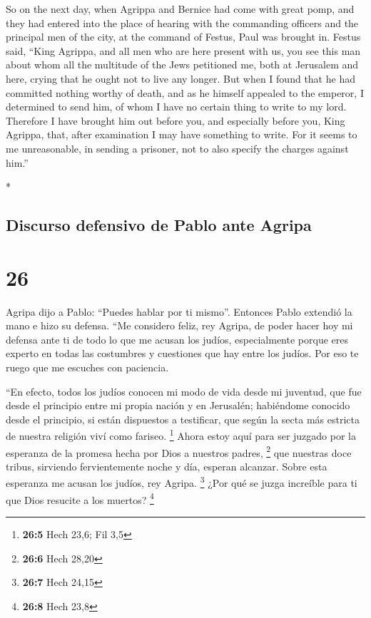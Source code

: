 \begin{paracol}{2}
\begin{otherlanguage}{english}
 So on the next day, when Agrippa and Bernice had come
with great pomp, and they had entered into the place of hearing with the
commanding officers and the principal men of the city, at the command of
Festus, Paul was brought in.  Festus said, ``King
Agrippa, and all men who are here present with us, you see this man
about whom all the multitude of the Jews petitioned me, both at
Jerusalem and here, crying that he ought not to live any longer.
 But when I found that he had committed nothing worthy of
death, and as he himself appealed to the emperor, I determined to send
him,  of whom I have no certain thing to write to my
lord. Therefore I have brought him out before you, and especially before
you, King Agrippa, that, after examination I may have something to
write.  For it seems to me unreasonable, in sending a
prisoner, not to also specify the charges against him.''

\end{otherlanguage}

\switchcolumn[0]*

\hypertarget{discurso-defensivo-de-pablo-ante-agripa}{%
\subsection{Discurso defensivo de Pablo ante
Agripa}\label{discurso-defensivo-de-pablo-ante-agripa}}

\hypertarget{section-50}{%
\section{26}\label{section-50}}

 Agripa dijo a Pablo: ``Puedes hablar por ti mismo''.
Entonces Pablo extendió la mano e hizo su defensa.  ``Me
considero feliz, rey Agripa, de poder hacer hoy mi defensa ante ti de
todo lo que me acusan los judíos,  especialmente porque
eres experto en todas las costumbres y cuestiones que hay entre los
judíos. Por eso te ruego que me escuches con paciencia.

 ``En efecto, todos los judíos conocen mi modo de vida
desde mi juventud, que fue desde el principio entre mi propia nación y
en Jerusalén;  habiéndome conocido desde el principio, si
están dispuestos a testificar, que según la secta más estricta de
nuestra religión viví como fariseo. \footnote{\textbf{26:5} Hech 23,6;
  Fil 3,5}  Ahora estoy aquí para ser juzgado por la
esperanza de la promesa hecha por Dios a nuestros padres, \footnote{\textbf{26:6}
  Hech 28,20}  que nuestras doce tribus, sirviendo
fervientemente noche y día, esperan alcanzar. Sobre esta esperanza me
acusan los judíos, rey Agripa. \footnote{\textbf{26:7} Hech 24,15}
 ¿Por qué se juzga increíble para ti que Dios resucite a
los muertos? \footnote{\textbf{26:8} Hech 23,8}


\end{paracol}

